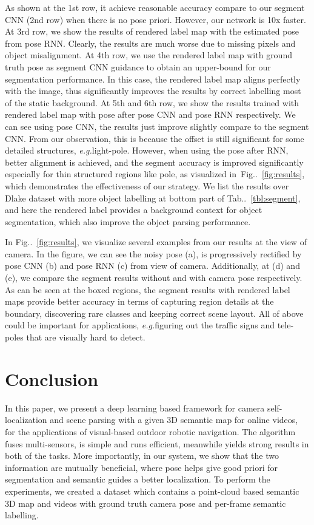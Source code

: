 \documentclass[10pt,twocolumn,letterpaper]{article}
\makeatletter
\newcommand{\figref}[1]{Fig\onedot~\ref{#1}}
\newcommand{\tabref}[1]{Tab\onedot~\ref{#1}}
\DeclareRobustCommand\onedot{\futurelet\@let@token\@onedot}
\def\onedot{\ifx\@let@token.\else.\null\fi\xspace}
\def\eg{\emph{e.g.}}
\makeatother
\begin{document}
As shown at the 1st row, it achieve reasonable accuracy compare to our segment CNN (2nd row) when there is no pose priori. However, our network is 10x faster. 
At 3rd row, we show the results of rendered label map with the estimated pose from pose RNN. Clearly, the results are much worse due to missing pixels and object misalignment.
At 4th row, we use the rendered label map with ground truth pose as segment CNN guidance to obtain an upper-bound for our segmentation performance. 
In this case, the rendered label map aligns perfectly with the image, thus significantly improves the results by correct labelling most of the static background.
At 5th and 6th row, we show the results trained with rendered label map with pose after pose CNN and pose RNN respectively. We can see using pose CNN, the results just improve slightly compare to the segment CNN. From our observation, this is because the offset is still significant for some detailed structures, \eg light-pole.
However, when using the pose after RNN, better alignment is achieved, and the segment accuracy is improved significantly especially for thin structured regions like pole, as visualized in~\figref{fig:results}, which demonstrates the effectiveness of our strategy. We list the results over Dlake dataset with more object labelling at bottom part of \tabref{tbl:segment}, and here the rendered label provides a background context for object segmentation, which also improve the object parsing performance. 

In \figref{fig:results}, we visualize several examples from our results at the view of camera. In the figure, we can see the noisy pose (a), is progressively rectified by pose CNN (b) and pose RNN (c) from view of camera. 
Additionally, at (d) and (e), we compare the segment results without and with camera pose respectively. As can be seen at the boxed regions, the segment results with rendered label maps provide better accuracy in terms of capturing region details at the boundary, discovering rare classes and keeping correct scene layout. All of above could be important for applications, \eg figuring out the traffic signs and tele-poles that are visually hard to detect.

\vspace{-0.8\baselineskip}
\section{Conclusion}
\vspace{-0.5\baselineskip}
\label{sec:conclusion}
In this paper, we present a deep learning based framework for camera self-localization and scene parsing with a given 3D semantic map for online videos, for the applications of visual-based outdoor robotic navigation. The algorithm fuses multi-sensors, is simple and runs efficient, meanwhile yields strong results in both of the tasks. More importantly, in our system, we show that the two information are mutually beneficial, where pose helps give good priori for segmentation and semantic guides a better localization. To perform the experiments, we created a dataset which contains a point-cloud based semantic 3D map and videos with ground truth camera pose and per-frame semantic labelling. 




{\small


}
\end{document}
